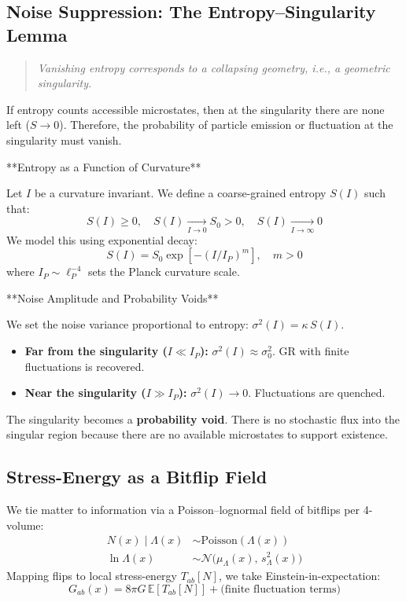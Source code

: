 \documentclass[11pt]{article}
\begin{document}
\subsection{Noise Suppression: The Entropy--Singularity Lemma}
\begin{quote}
\textit{Vanishing entropy corresponds to a collapsing geometry, i.e., a geometric singularity.}
\end{quote}

If entropy counts accessible microstates, then at the singularity there are none left ($S \to 0$). Therefore, the probability of particle emission or fluctuation at the singularity must vanish.

**Entropy as a Function of Curvature**

Let $I$ be a curvature invariant. We define a coarse-grained entropy $S(I)$ such that:
\[
S(I) \ge 0, \quad S(I) \xrightarrow[I\to 0]{} S_0 > 0, \quad S(I) \xrightarrow[I\to \infty]{} 0
\]
We model this using exponential decay:
\[
S(I) = S_0 \exp\!\left[-(I/I_P)^m\right], \quad m > 0
\]
where $I_P \sim \ell_P^{-4}$ sets the Planck curvature scale.

**Noise Amplitude and Probability Voids**

We set the noise variance proportional to entropy: $\sigma^2(I) = \kappa\, S(I)$.
\begin{itemize}
    \item \textbf{Far from the singularity ($I \ll I_P$):} $\sigma^2(I) \approx \sigma_0^2$. GR with finite fluctuations is recovered.
    \item \textbf{Near the singularity ($I \gg I_P$):} $\sigma^2(I) \to 0$. Fluctuations are quenched.
\end{itemize}
The singularity becomes a \textbf{probability void}. There is no stochastic flux into the singular region because there are no available microstates to support existence.

\subsection{Stress-Energy as a Bitflip Field}
We tie matter to information via a Poisson--lognormal field of bitflips per 4-volume:
\begin{align*}
N(x)\mid\Lambda(x) &\sim \mathrm{Poisson}(\Lambda(x)) \\
\ln \Lambda(x) &\sim \mathcal{N}\!\big(\mu_\Lambda(x),\, s^2_\Lambda(x)\big)
\end{align*}
Mapping flips to local stress-energy $T_{ab}[N]$, we take Einstein-in-expectation:
\[
G_{ab}(x) = 8\pi G\,\mathbb{E}[T_{ab}[N]] + \text{(finite fluctuation terms)}
\]
\end{document}
